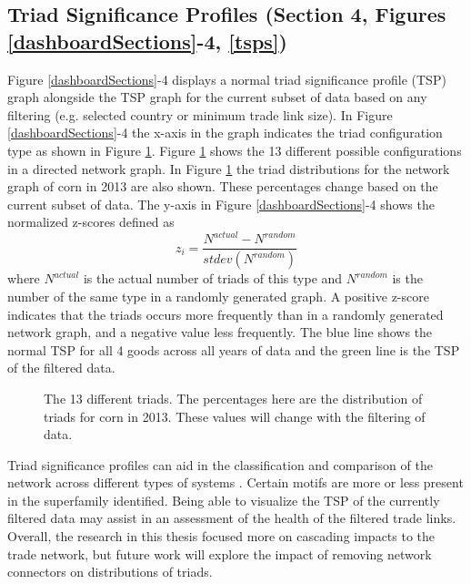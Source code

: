 	\subsection{Triad Significance Profiles (Section 4, Figures \ref{dashboardSections}-4, \ref{tsps})}
		Figure \ref{dashboardSections}-4 displays a normal triad significance profile (TSP) graph alongside the TSP graph for the current subset of data based on any filtering (e.g. selected country or minimum trade link size). In Figure \ref{dashboardSections}-4 the x-axis in the graph indicates the triad configuration type as shown in Figure \ref{triads}. Figure \ref{triads} shows the 13 different possible configurations in a directed network graph. In Figure \ref{triads} the triad distributions for the network graph of corn in 2013 are also shown. These percentages change based on the current subset of data. The y-axis in Figure \ref{dashboardSections}-4 shows the normalized z-scores defined as
		\begin{equation} \label{zScore}
			z_i=\frac{N^{actual} - N^{random}}{stdev(N^{random})}
		\end{equation}
		where $N^{actual}$ is the actual number of triads of this type and $N^{random}$ is the number of the same type in a randomly generated graph. A positive z-score indicates that the triads occurs more frequently than in a randomly generated network graph, and a negative value less frequently. The blue line shows the normal TSP for all 4 goods across all years of data and the green line is the TSP of the filtered data.\par		
		\begin{figure}[htb]
			\caption[13 DIFFERENT TRIADS]{The 13 different triads. The percentages here are the distribution of triads for corn in 2013. These values will change with the filtering of data.}
			\label{triads}
		\end{figure}
		Triad significance profiles can aid in the classification and comparison of the network across different types of systems \citep{shutters2012agricultural}. Certain motifs are more or less present in the superfamily identified. Being able to visualize the TSP of the currently filtered data may assist in an assessment of the health of the filtered trade links. Overall, the research in this thesis focused more on cascading impacts to the trade network, but future work will explore the impact of removing network connectors on distributions of triads.\par
